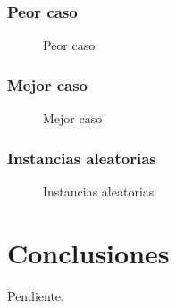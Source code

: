 \documentclass[a4paper, 10pt, twoside]{article}
\begin{document}
\subsubsection{Peor caso}

\begin{figure}[H]
  \centering
  
  \caption{Peor caso}
\end{figure}


\subsubsection{Mejor caso}

\begin{figure}[H]
  \centering
  
  \caption{Mejor caso}
\end{figure}


\subsubsection{Instancias aleatorias}

\begin{figure}[H]
  \centering
  
  \caption{Instancias aleatorias}
\end{figure}




\newpage

\section{Conclusiones}

Pendiente.




\newpage
\end{document}

